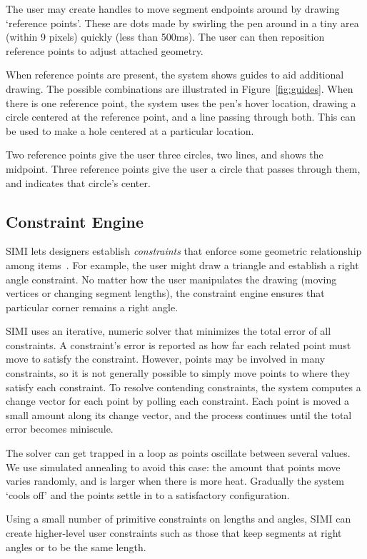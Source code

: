 \documentclass{article}
\begin{document}
The user may create handles to move segment endpoints around by
drawing `reference points'. These are dots made by swirling the pen
around in a tiny area (within 9 pixels) quickly (less than 500ms). The
user can then reposition reference points to adjust attached geometry.

When reference points are present, the system shows guides to aid
additional drawing. The possible combinations are illustrated in
Figure~\ref{fig:guides}. When there is one reference point, the system
uses the pen's hover location, drawing a circle centered at the
reference point, and a line passing through both. This can be used to
make a hole centered at a particular location.

Two reference points give the user three circles, two lines, and shows
the midpoint. Three reference points give the user a circle that
passes through them, and indicates that circle's center.

\subsection{Constraint Engine}

SIMI lets designers establish \textit{constraints} that enforce some
geometric relationship among items~\cite{borning-thinglab}. For
example, the user might draw a triangle and establish a right angle
constraint. No matter how the user manipulates the drawing (moving
vertices or changing segment lengths), the constraint engine ensures
that particular corner remains a right angle.

SIMI uses an iterative, numeric solver that minimizes the total error
of all constraints. A constraint's error is reported as how far each
related point must move to satisfy the constraint. However, points may
be involved in many constraints, so it is not generally possible to
simply move points to where they satisfy each constraint. To resolve
contending constraints, the system computes a change vector for each
point by polling each constraint. Each point is moved a small amount
along its change vector, and the process continues until the total
error becomes miniscule.

The solver can get trapped in a loop as points oscillate between
several values. We use simulated annealing to avoid this case: the
amount that points move varies randomly, and is larger when there is
more heat. Gradually the system `cools off' and the points settle in
to a satisfactory configuration.

Using a small number of primitive constraints on lengths and angles,
SIMI can create higher-level user constraints such as those that keep
segments at right angles or to be the same length.
\end{document}
